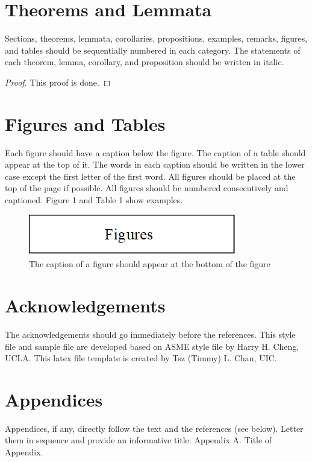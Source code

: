 \documentclass{ICLSarticle}
\begin{document}
\section{Theorems and Lemmata}

\begin{theorem}
Sections, theorems, lemmata, corollaries, propositions, examples, remarks, figures, and tables should be sequentially numbered in each category. The statements of each theorem, lemma, corollary, and proposition should be written in italic.
\end{theorem}

\begin{proof}
This proof is done.
\end{proof}

\section{Figures and Tables}
Each figure should have a caption below the figure. The caption of a table should appear at the top of it. The words in each caption should be written in the lower case except the first letter of the first word. All figures should be placed at the top of the page if possible. All figures should be numbered consecutively and captioned. Figure 1 and Table 1 show examples.

\begin{figure}[H]
\centering
\includegraphics[width=.5\columnwidth]{figure}
\caption{The caption of a figure should appear at the bottom of the figure}
\end{figure}
\section*{Acknowledgements}
The acknowledgements should go immediately before the references. This style file and sample file are developed based on ASME style file by Harry H. Cheng, UCLA. This latex file template is created by Tsz (Timmy) L. Chan, UIC.


\appendix
\section*{Appendices}
Appendices, if any, directly follow the text and the references (see below). Letter them in sequence and provide an informative title: Appendix A. Title of Appendix. 
\end{document}
